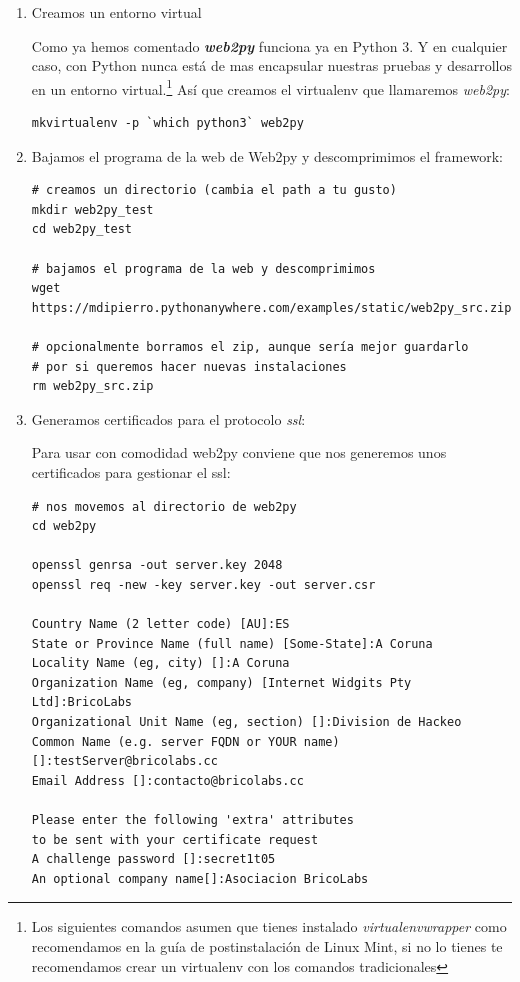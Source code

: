 \documentclass[
  12pt,
  spanish,
]{article}
\begin{document}
\begin{enumerate}
\def\labelenumi{\arabic{enumi}.}
\item
  Creamos un entorno virtual

  Como ya hemos comentado \textbf{\emph{web2py}} funciona ya en Python
  3. Y en cualquier caso, con Python nunca está de mas encapsular
  nuestras pruebas y desarrollos en un entorno virtual.\footnote{Los
    siguientes comandos asumen que tienes instalado
    \emph{virtualenvwrapper} como recomendamos en la guía de
    postinstalación de Linux Mint, si no lo tienes te recomendamos crear
    un virtualenv con los comandos tradicionales} Así que creamos el
  virtualenv que llamaremos \emph{web2py}:

\begin{verbatim}
mkvirtualenv -p `which python3` web2py
\end{verbatim}
\item
  Bajamos el programa de la web de Web2py y descomprimimos el framework:

\begin{verbatim}
# creamos un directorio (cambia el path a tu gusto)
mkdir web2py_test
cd web2py_test

# bajamos el programa de la web y descomprimimos
wget https://mdipierro.pythonanywhere.com/examples/static/web2py_src.zip

# opcionalmente borramos el zip, aunque sería mejor guardarlo
# por si queremos hacer nuevas instalaciones
rm web2py_src.zip
\end{verbatim}
\item
  Generamos certificados para el protocolo \emph{ssl}:

  Para usar con comodidad web2py conviene que nos generemos unos
  certificados para gestionar el ssl:

\begin{verbatim}
# nos movemos al directorio de web2py
cd web2py

openssl genrsa -out server.key 2048
openssl req -new -key server.key -out server.csr

Country Name (2 letter code) [AU]:ES
State or Province Name (full name) [Some-State]:A Coruna
Locality Name (eg, city) []:A Coruna
Organization Name (eg, company) [Internet Widgits Pty Ltd]:BricoLabs
Organizational Unit Name (eg, section) []:Division de Hackeo
Common Name (e.g. server FQDN or YOUR name) []:testServer@bricolabs.cc
Email Address []:contacto@bricolabs.cc

Please enter the following 'extra' attributes
to be sent with your certificate request
A challenge password []:secret1t05
An optional company name[]:Asociacion BricoLabs
\end{verbatim}


\end{enumerate}
\end{document}
